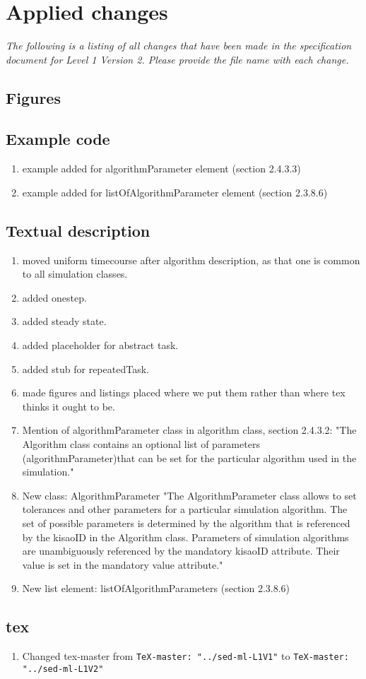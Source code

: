\documentclass{article}
\newcommand{\code}[1]{\texttt{#1}}
\begin{document}
\section{Applied changes}
\emph{The following is a listing of all changes that have been made in the specification document for Level 1 Version 2. Please provide the file name with each change.}

\subsection{Figures}

\subsection{Example code}
\begin{enumerate}
\item example added for algorithmParameter element (section 2.4.3.3)
\item example added for listOfAlgorithmParameter element (section 2.3.8.6)
\end{enumerate}

\subsection{Textual description}

\begin{enumerate}
\item moved uniform timecourse after algorithm description, as that one is common to all simulation classes. 
\item added onestep. 
\item added steady state. 
\item added placeholder for abstract task.
\item added stub for repeatedTask.
\item made figures and listings placed where we put them rather than where tex thinks it ought to be. 


\item Mention of algorithmParameter class in algorithm class, section 2.4.3.2: "The Algorithm class contains an optional list of parameters (algorithmParameter)that can be set for the particular algorithm used in the simulation."
\item New class: AlgorithmParameter "The AlgorithmParameter class allows to set tolerances and other parameters for a particular simulation
algorithm. The set of possible parameters is determined by the algorithm that is referenced by the
kisaoID in the Algorithm class. Parameters of simulation algorithms are unambiguously referenced by
the mandatory kisaoID attribute. Their value is set in the mandatory value attribute."
\item New list element: listOfAlgorithmParameters (section 2.3.8.6)
\end{enumerate}

\subsection{tex}

\begin{enumerate}
\item Changed tex-master from  \code{TeX-master: "../sed-ml-L1V1"} to  \code{TeX-master: "../sed-ml-L1V2"}
\end{enumerate}
\end{document}
